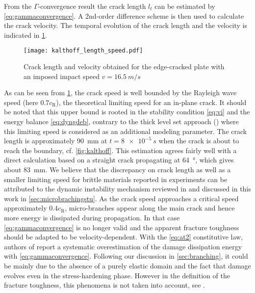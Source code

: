 From the $\Gamma$-convergence result the crack length $l_t$ can be estimated by \eqref{eq:gammaconvergence}. A 2nd-order difference scheme is then used to calculate the crack velocity. The temporal evolution of the crack length and the velocity is indicated in \cref{fig:crack_length_speed}.
\begin{figure}[htbp]
\centering
\texttt{[image: kalthoff\_length\_speed.pdf]}
\caption{Crack length and velocity obtained for the edge-cracked plate with an imposed impact speed $v=\SI{16.5}{m/s}$} \label{fig:crack_length_speed}
\end{figure}
As can be seen from \cref{fig:crack_length_speed}, the crack speed is well bounded by the Rayleigh wave speed (here $0.7c_\mathrm{R}$), the theoretical limiting speed for an in-plane crack. It should be noted that this upper bound is rooted in the stability condition \eqref{eq:vi} and the energy balance \eqref{eq:dyngdeb}, contrary to the thick level set approach (\cite{MoreauMoesPicartStainier:2015}) where this limiting speed is considered as an additional modeling parameter. The crack length is approximately \SI{90}{mm} at $t=\SI{8e-5}{s}$ when the crack is about to reach the boundary, cf. \cref{fig:kalthoff}. This estimation agrees fairly well with a direct calculation based on a straight crack propagating at \SI{64}{\degree}, which gives about \SI{83}{mm}. We believe that the discrepancy on crack length as well as a smaller limiting speed for brittle materials reported in experiments can be attributed to the dynamic instability mechanism reviewed in \cite{FinebergMarder:1999} and discussed in this work in \cref{sec:microbrachingstu}. As the crack speed approaches a critical speed approximately $0.4c_\mathrm{R}$, micro-branches appear along the main crack and hence more energy is dissipated during propagation. In that case \eqref{eq:gammaconvergence} is no longer valid and the apparent fracture toughness should be adapted to be velocity-dependent. With the \eqref{eq:at2} constitutive law, authors of \cite{BordenVerhooselScottHughesLandis:2012,VignolletMayBorstVerhoosel:2014} report a systematic overestimation of the damage dissipation energy with \eqref{eq:gammaconvergence}. Following our discussion in \cref{sec:branching}, it could be mainly due to the absence of a purely elastic domain and the fact that damage evolves even in the stress-hardening phase. However in the definition of the fracture toughness, this phenomena is not taken into account, see \cite{BourdinFrancfortMarigo:2008}.

